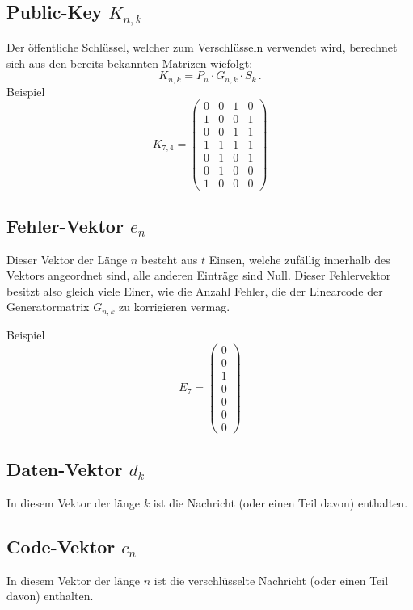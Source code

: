 \subsection{Public-Key $K_{n,k}$
\label{mceliece:subsection:k_nk}}
Der öffentliche Schlüssel, welcher zum Verschlüsseln verwendet wird,
berechnet sich aus den bereits bekannten Matrizen wiefolgt:
\[
    K_{n,k}=P_{n}\cdot G_{n,k}\cdot S_{k}\,.
\]
Beispiel
\[
    K_{7,4}=
    \begin{pmatrix}
        0 & 0 & 1 & 0\\
        1 & 0 & 0 & 1\\
        0 & 0 & 1 & 1\\
        1 & 1 & 1 & 1\\
        0 & 1 & 0 & 1\\
        0 & 1 & 0 & 0\\
        1 & 0 & 0 & 0
    \end{pmatrix}
\]

\subsection{Fehler-Vektor $e_n$
\label{mceliece:subsection:e_n}}
Dieser Vektor der Länge $n$ besteht aus $t$ Einsen, welche zufällig innerhalb des Vektors angeordnet sind,
alle anderen Einträge sind Null.
Dieser Fehlervektor besitzt also gleich viele Einer,
wie die Anzahl Fehler, die der Linearcode der Generatormatrix $G_{n,k}$ zu korrigieren vermag.

Beispiel
\[
    E_7=
    \begin{pmatrix}
        0\\
        0\\
        1\\
        0\\
        0\\
        0\\
        0
    \end{pmatrix}
\]

\subsection{Daten-Vektor $d_k$
\label{mceliece:subsection:d_k}}
In diesem Vektor der länge $k$ ist die Nachricht (oder einen Teil davon) enthalten.

\subsection{Code-Vektor $c_n$
\label{mceliece:subsection:c_n}}
In diesem Vektor der länge $n$ ist die verschlüsselte Nachricht (oder einen Teil davon) enthalten.
